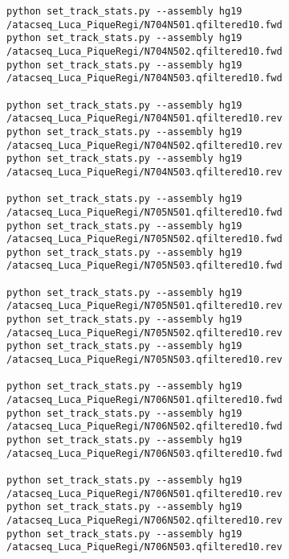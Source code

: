 \documentclass[11pt]{article}
\begin{document}
\begin{lstlisting}
python set_track_stats.py --assembly hg19 /atacseq_Luca_PiqueRegi/N704N501.qfiltered10.fwd
python set_track_stats.py --assembly hg19 /atacseq_Luca_PiqueRegi/N704N502.qfiltered10.fwd
python set_track_stats.py --assembly hg19 /atacseq_Luca_PiqueRegi/N704N503.qfiltered10.fwd

python set_track_stats.py --assembly hg19 /atacseq_Luca_PiqueRegi/N704N501.qfiltered10.rev
python set_track_stats.py --assembly hg19 /atacseq_Luca_PiqueRegi/N704N502.qfiltered10.rev
python set_track_stats.py --assembly hg19 /atacseq_Luca_PiqueRegi/N704N503.qfiltered10.rev

python set_track_stats.py --assembly hg19 /atacseq_Luca_PiqueRegi/N705N501.qfiltered10.fwd
python set_track_stats.py --assembly hg19 /atacseq_Luca_PiqueRegi/N705N502.qfiltered10.fwd
python set_track_stats.py --assembly hg19 /atacseq_Luca_PiqueRegi/N705N503.qfiltered10.fwd

python set_track_stats.py --assembly hg19 /atacseq_Luca_PiqueRegi/N705N501.qfiltered10.rev
python set_track_stats.py --assembly hg19 /atacseq_Luca_PiqueRegi/N705N502.qfiltered10.rev
python set_track_stats.py --assembly hg19 /atacseq_Luca_PiqueRegi/N705N503.qfiltered10.rev

python set_track_stats.py --assembly hg19 /atacseq_Luca_PiqueRegi/N706N501.qfiltered10.fwd
python set_track_stats.py --assembly hg19 /atacseq_Luca_PiqueRegi/N706N502.qfiltered10.fwd
python set_track_stats.py --assembly hg19 /atacseq_Luca_PiqueRegi/N706N503.qfiltered10.fwd

python set_track_stats.py --assembly hg19 /atacseq_Luca_PiqueRegi/N706N501.qfiltered10.rev
python set_track_stats.py --assembly hg19 /atacseq_Luca_PiqueRegi/N706N502.qfiltered10.rev
python set_track_stats.py --assembly hg19 /atacseq_Luca_PiqueRegi/N706N503.qfiltered10.rev
\end{lstlisting}
\end{document}
